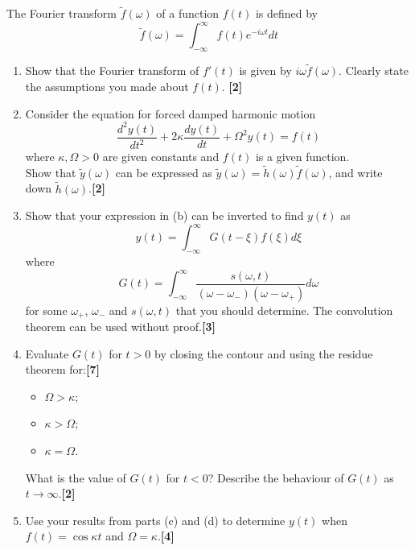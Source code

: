\documentclass[a4paper]{article}
\begin{document}
\begin{qns}
The Fourier transform $\tilde{f}(\omega)$ of a function $f(t)$ is defined by
$$\tilde{f}(\omega)=\int_{-\infty}^\infty f(t)e^{-i\omega t}dt$$
\begin{enumerate}[label=(\alph*)]
\item Show that the Fourier transform of $f'(t)$ is given by $i\omega\tilde{f}(\omega)$. Clearly state the assumptions you made about $f(t)$. \hfill\textbf{[2]}
\item Consider the equation for forced damped harmonic motion
$$\frac{d^2y(t)}{dt^2}+2\kappa\frac{dy(t)}{dt}+\Omega^2y(t)=f(t)$$
where $\kappa,\Omega>0$ are given constants and $f(t)$ is a given function.\\[5pt]
Show that $\tilde{y}(\omega)$ can be expressed as $\tilde{y}(\omega)=\tilde{h}(\omega)\tilde{f}(\omega)$, and write down $\tilde{h}(\omega)$.\hfill\textbf{[2]}
\item Show that your expression in (b) can be inverted to find $y(t)$ as
$$y(t)=\int_{-\infty}^\infty G(t-\xi)f(\xi)d\xi$$
where
$$G(t)=\int_{-\infty}^\infty\frac{s(\omega,t)}{(\omega-\omega_-)(\omega-\omega_+)}d\omega$$
for some $\omega_+$, $\omega_-$ and $s(\omega, t)$ that you should determine. The convolution theorem can be used without proof.\hfill\textbf{[3]}
\item Evaluate $G(t)$ for $t > 0$ by closing the contour and using the residue theorem for:\hfill\textbf{[7]}
\begin{itemize}
    \item $\Omega>\kappa$;
    \item $\kappa>\Omega$;
    \item $\kappa=\Omega$.
\end{itemize}
What is the value of $G(t)$ for $t < 0$? Describe the behaviour of $G(t)$ as $t\rightarrow\infty$.\hfill\textbf{[2]}
\item Use your results from parts (c) and (d) to determine $y(t)$ when $f(t) = \cos\kappa t$ and $\Omega=\kappa$.\hfill\textbf{[4]}
\end{enumerate}
\end{qns}
\end{document}
